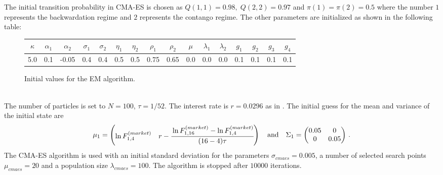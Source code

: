 The initial transition probability in CMA-ES is chosen as $Q(1,1) = 0.98, \; Q(2,2) = 0.97$ and $\pi(1) = \pi(2) = 0.5$ where the number $1$ represents the backwardation regime and $2$ represents the contango regime. The other parameters are initialized as shown in the following table:
\begin{figure}[h!]
	\centering
	\begin{tabular}{||c|c|c|c|c|c|c|c|c|c|c|c|c|c|c|c||}
		$\kappa$ & $\alpha_1$ & $\alpha_2$ & $\sigma_1$ & $\sigma_2$ & $\eta_1$ & $\eta_2$ & $\rho_1$ & $\rho_2$ & $\mu$ & $\lambda_1$ & $\lambda_2$ & $g_1$ & $g_2$ & $g_3$ & $g_4$ \\
		\hline
		5.0 & 0.1 & -0.05 & 0.4 & 0.4 & 0.5 & 0.5 & 0.75 & 0.65 & 0.0 & 0.0 & 0.0 & 0.1 & 0.1 & 0.1 & 0.1
	\end{tabular}
	\caption{Initial values for the EM algorithm.}
\end{figure}\\
The number of particles is set to $N = 100$, $\tau  = 1/52$. %
The interest rate is $r = 0.0296$ as in \cite{almansour:2016}. The initial guess for the mean and variance of the initial state are
\[
\mu_1 = \begin{pmatrix} \ln F^{(market)}_{1,4} & r-\cfrac{\ln F^{(market)}_{1,16}-\ln F^{(market)}_{1,4}}{(16-4)\tau} \end{pmatrix}\quad \mbox{and}\quad \Sigma_1 = \begin{pmatrix} 0.05 & 0 \\ 0 & 0.05 \end{pmatrix}\,.
\]
The CMA-ES algorithm is used with an initial standard deviation for the parameters $\sigma_{cmaes} = 0.005$, a number of selected search points $\mu_{cmaes} = 20$ and a population size $\lambda_{cmaes} = 100$. The algorithm is stopped after $10000$ iterations.
